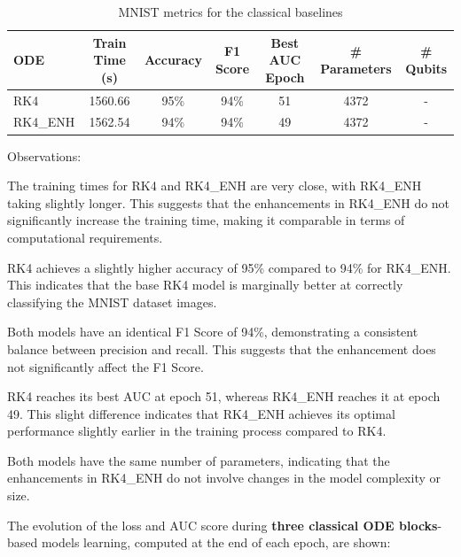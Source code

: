 \documentclass[12pt,a4paper]{report}
\begin{document}
\clearpage

\begin{table}[th]\small\linespread{1}
  \label{tab:classical_MNIST_1}
  \centering
  \begin{tabular}{|l|c|c|c|c|c|c|}
    \hline
    \textbf{ODE} & \textbf{Train Time (s)} & \textbf{Accuracy} & \textbf{F1 Score} & \textbf{Best AUC Epoch} & \textbf{\# Parameters} & \textbf{\# Qubits} \\
    \hline
    RK4          & 1560.66                 & 95\%              & 94\%              & 51                      & 4372                   & -                  \\
    RK4\_ENH     & 1562.54                 & 94\%              & 94\%              & 49                      & 4372                   & -                  \\
    \hline
  \end{tabular}
  \caption{MNIST metrics for the classical baselines}
\end{table}

Observations:

The training times for RK4 and RK4\_ENH are very close, with RK4\_ENH taking slightly longer. This suggests that the enhancements in RK4\_ENH do not significantly increase the training time, making it comparable in terms of computational requirements.

RK4 achieves a slightly higher accuracy of 95\% compared to 94\% for RK4\_ENH. This indicates that the base RK4 model is marginally better at correctly classifying the MNIST dataset images.

Both models have an identical F1 Score of 94\%, demonstrating a consistent balance between precision and recall. This suggests that the enhancement does not significantly affect the F1 Score.

RK4 reaches its best AUC at epoch 51, whereas RK4\_ENH reaches it at epoch 49. This slight difference indicates that RK4\_ENH achieves its optimal performance slightly earlier in the training process compared to RK4.

Both models have the same number of parameters, indicating that the enhancements in RK4\_ENH do not involve changes in the model complexity or size.

\clearpage

The evolution of the loss and AUC score during \textbf{three classical ODE blocks}-based models learning, computed at the end of each epoch, are shown:
\end{document}
